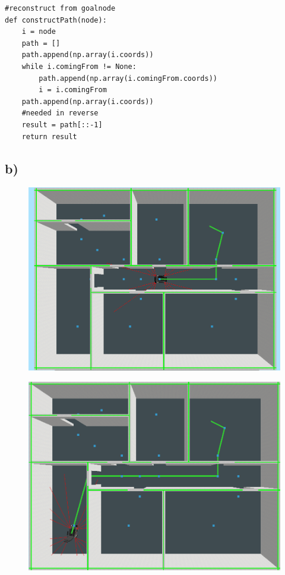 \documentclass{../Vorlage/mat}
\begin{document}
\begin{lstlisting}
#reconstruct from goalnode
def constructPath(node):
    i = node
    path = []
    path.append(np.array(i.coords))
    while i.comingFrom != None:
        path.append(np.array(i.comingFrom.coords))
        i = i.comingFrom
    path.append(np.array(i.coords))
    #needed in reverse
    result = path[::-1]
    return result
\end{lstlisting}
\newpage
\subsection*{b)}
\begin{figure}[!htbp]
\centering
\begin{minipage}{.5\textwidth}
  \centering
  \includegraphics[scale=0.2]{astar_start.png}
  \label{fig1}
\end{minipage}%
\begin{minipage}{.5\textwidth}
  \centering
  \includegraphics[scale=0.21]{astar_downleft.png}

\end{minipage}
\end{figure}
\end{document}
